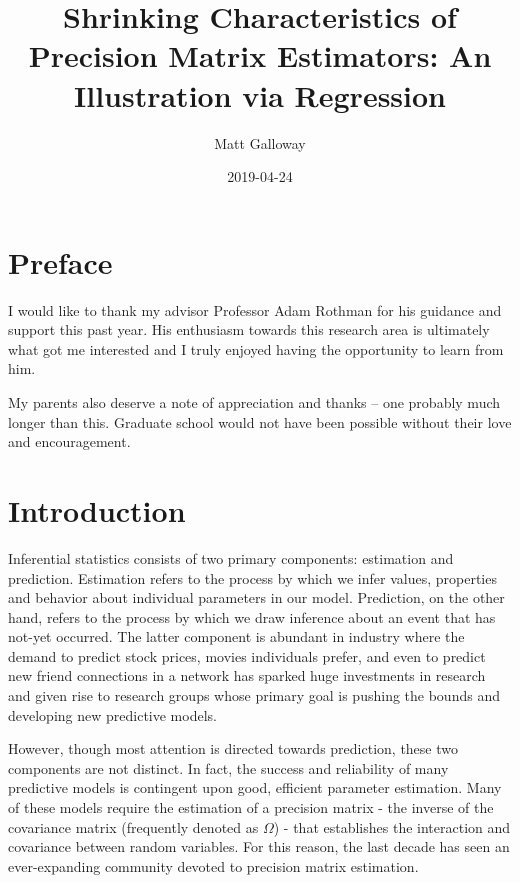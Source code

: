 \documentclass[11pt,]{report}
\title{Shrinking Characteristics of Precision Matrix Estimators: An Illustration via Regression}
\author{Matt Galloway}
\date{2019-04-24}
\theoremstyle{definition}
\theoremstyle{definition}
\theoremstyle{definition}
\theoremstyle{remark}
\begin{document}
\maketitle

{
\hypersetup{linkcolor=}
\setcounter{tocdepth}{1}
\tableofcontents
}
\hypertarget{preface}{%
\chapter*{Preface}\label{preface}}


I would like to thank my advisor Professor Adam Rothman for his guidance and support this past year. His enthusiasm towards this research area is ultimately what got me interested and I truly enjoyed having the opportunity to learn from him.

My parents also deserve a note of appreciation and thanks -- one probably much longer than this. Graduate school would not have been possible without their love and encouragement.

\hypertarget{intro}{%
\chapter{Introduction}\label{intro}}

Inferential statistics consists of two primary components: estimation and prediction. Estimation refers to the process by which we infer values, properties and behavior about individual parameters in our model. Prediction, on the other hand, refers to the process by which we draw inference about an event that has not-yet occurred. The latter component is abundant in industry where the demand to predict stock prices, movies individuals prefer, and even to predict new friend connections in a network has sparked huge investments in research and given rise to research groups whose primary goal is pushing the bounds and developing new predictive models.

However, though most attention is directed towards prediction, these two components are not distinct. In fact, the success and reliability of many predictive models is contingent upon good, efficient parameter estimation. Many of these models require the estimation of a precision matrix - the inverse of the covariance matrix (frequently denoted as \(\Omega\)) - that establishes the interaction and covariance between random variables. For this reason, the last decade has seen an ever-expanding community devoted to precision matrix estimation.
\end{document}
